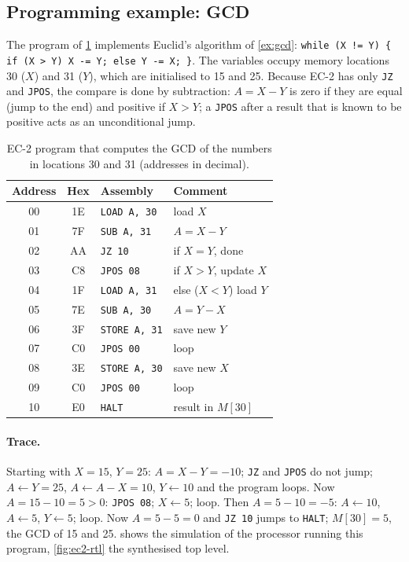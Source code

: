 
\subsection{Programming example: GCD}
The program of \cref{tab:ec2-gcd} implements Euclid's algorithm of \cref{ex:gcd}: \texttt{while (X != Y) \{ if (X > Y) X -= Y; else Y -= X; \}}. The variables occupy memory locations 30 ($X$) and 31 ($Y$), which are initialised to 15 and 25. Because EC-2 has only \texttt{JZ} and \texttt{JPOS}, the compare is done by subtraction: $A=X-Y$ is zero if they are equal (jump to the end) and positive if $X>Y$; a \texttt{JPOS} after a result that is known to be positive acts as an unconditional jump.

\begin{table}[htbp]
\centering
\caption{EC-2 program that computes the GCD of the numbers in locations 30 and 31 (addresses in decimal).}
\label{tab:ec2-gcd}
\begin{tabular}{ccll}
\toprule Address & Hex & Assembly & Comment\\ \midrule
00 & 1E & \texttt{LOAD A, 30} & load $X$\\
01 & 7F & \texttt{SUB A, 31} & $A=X-Y$\\
02 & AA & \texttt{JZ 10} & if $X=Y$, done\\
03 & C8 & \texttt{JPOS 08} & if $X>Y$, update $X$\\
04 & 1F & \texttt{LOAD A, 31} & else ($X<Y$) load $Y$\\
05 & 7E & \texttt{SUB A, 30} & $A=Y-X$\\
06 & 3F & \texttt{STORE A, 31} & save new $Y$\\
07 & C0 & \texttt{JPOS 00} & loop\\
08 & 3E & \texttt{STORE A, 30} & save new $X$\\
09 & C0 & \texttt{JPOS 00} & loop\\
10 & E0 & \texttt{HALT} & result in $M[30]$\\ \bottomrule
\end{tabular}
\end{table}

\paragraph{Trace.} Starting with $X=15$, $Y=25$: $A=X-Y=-10$; \texttt{JZ} and \texttt{JPOS} do not jump; $A\leftarrow Y=25$, $A\leftarrow A-X=10$, $Y\leftarrow10$ and the program loops. Now $A=15-10=5>0$: \texttt{JPOS 08}; $X\leftarrow5$; loop. Then $A=5-10=-5$: $A\leftarrow10$, $A\leftarrow5$, $Y\leftarrow5$; loop. Now $A=5-5=0$ and \texttt{JZ 10} jumps to \texttt{HALT}; $M[30]=5$, the GCD of 15 and 25.  shows the simulation of the processor running this program, \cref{fig:ec2-rtl} the synthesised top level.


